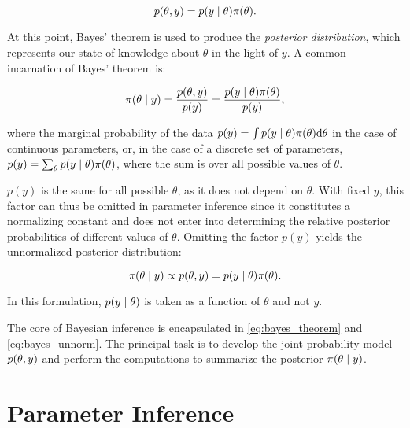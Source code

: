 \begin{equation*}
    p(\theta, y) = p \qty(y \mid \theta) \pi \qty(\theta) .
\end{equation*}

At this point, Bayes' theorem is used to produce the \textit{posterior distribution}, which represents our state of knowledge about $\theta$ in the light of $y$. A common incarnation of Bayes' theorem is:

\begin{equation}\label{eq:bayes_theorem}
    \pi \qty(\theta \mid y) = \frac{p(\theta, y)}{p(y)}  = \frac{p \qty(y \mid \theta) \pi \qty(\theta)}{p(y)},
\end{equation}

where the marginal probability of the data $p(y) = \int p \qty(y \mid \theta) \pi \qty(\theta) \dd \theta$ in the case of continuous parameters, or, in the case of a discrete set of parameters, $p(y) = \sum_\theta p \qty(y \mid \theta) \pi \qty(\theta)$, where the sum is over all possible values of $\theta$.

$p(y)$ is the same for all possible $\theta$, as it does not depend on $\theta$. With fixed $y$, this factor can thus be omitted in parameter inference since it constitutes a normalizing constant and does not enter into determining the relative posterior probabilities of different values of $\theta$. Omitting the factor $p(y)$ yields the unnormalized posterior distribution: 

\begin{equation}\label{eq:bayes_unnorm}
    \pi \qty(\theta \mid y) \propto p(\theta, y) =  p \qty(y \mid \theta) \pi \qty(\theta) .
\end{equation}

In this formulation, $p \qty(y \mid \theta)$ is taken as a function of $\theta$ and not $y$.  

The core of Bayesian inference is encapsulated in \autoref{eq:bayes_theorem} and \autoref{eq:bayes_unnorm}. The principal task is to develop the joint probability model $p(\theta, y)$ and perform the computations to summarize the posterior $\pi \qty(\theta \mid y)$.


\section{Parameter Inference}\label{sec:param_inference}

